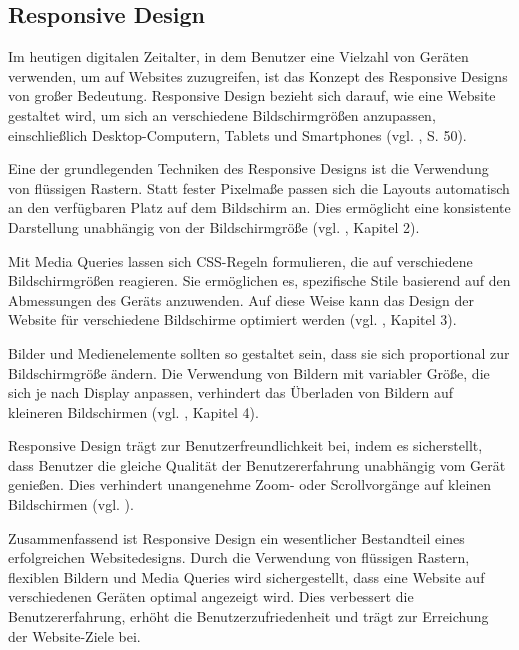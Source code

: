 \documentclass[fontsize=12pt,openright,oneside,paper=a4,BCOR=1cm]{scrbook}
\begin{document}
\subsection{Responsive Design}
Im heutigen digitalen Zeitalter, in dem Benutzer eine Vielzahl von Geräten verwenden, um auf Websites zuzugreifen, ist das Konzept des Responsive Designs von großer Bedeutung. Responsive Design bezieht sich darauf, wie eine Website gestaltet wird, um sich an verschiedene Bildschirmgrößen anzupassen, einschließlich Desktop-Computern, Tablets und Smartphones (vgl. \cite{almeida2017role}, S. 50).	

Eine der grundlegenden Techniken des Responsive Designs ist die Verwendung von flüssigen Rastern. Statt fester Pixelmaße passen sich die Layouts automatisch an den verfügbaren Platz auf dem Bildschirm an. Dies ermöglicht eine konsistente Darstellung unabhängig von der Bildschirmgröße (vgl. \cite{kadlec2012implementing}, Kapitel 2).

Mit Media Queries lassen sich CSS-Regeln formulieren, die auf verschiedene Bildschirmgrößen reagieren. Sie ermöglichen es, spezifische Stile basierend auf den Abmessungen des Geräts anzuwenden. Auf diese Weise kann das Design der Website für verschiedene Bildschirme optimiert werden (vgl. \cite{kadlec2012implementing}, Kapitel 3).

Bilder und Medienelemente sollten so gestaltet sein, dass sie sich proportional zur Bildschirmgröße ändern. Die Verwendung von Bildern mit variabler Größe, die sich je nach Display anpassen, verhindert das Überladen von Bildern auf kleineren Bildschirmen (vgl. \cite{kadlec2012implementing}, Kapitel 4).  

Responsive Design trägt zur Benutzerfreundlichkeit bei, indem es sicherstellt, dass Benutzer die gleiche Qualität der Benutzererfahrung unabhängig vom Gerät genießen. Dies verhindert unangenehme Zoom- oder Scrollvorgänge auf kleinen Bildschirmen (vgl. \cite{activeweb}). 

Zusammenfassend ist Responsive Design ein wesentlicher Bestandteil eines erfolgreichen Websitedesigns. Durch die Verwendung von flüssigen Rastern, flexiblen Bildern und Media Queries wird sichergestellt, dass eine Website auf verschiedenen Geräten optimal angezeigt wird. Dies verbessert die Benutzererfahrung, erhöht die Benutzerzufriedenheit und trägt zur Erreichung der Website-Ziele bei.

\end{document}
